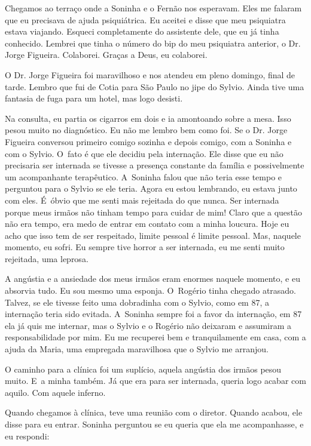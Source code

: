 Chegamos ao terraço onde a Soninha e o Fernão nos esperavam. Eles me
falaram que eu precisava de ajuda psiquiátrica. Eu aceitei e disse que
meu psiquiatra estava viajando. Esqueci completamente do assistente
dele, que eu já tinha conhecido. Lembrei que tinha o número do bip do
meu psiquiatra anterior, o Dr. Jorge Figueira. Colaborei. Graças a Deus,
eu colaborei.

O Dr. Jorge Figueira foi maravilhoso e nos atendeu em pleno domingo,
final de tarde. Lembro que fui de Cotia para São Paulo no jipe do
Sylvio. Ainda tive uma fantasia de fuga para um hotel, mas logo desisti.

Na consulta, eu partia os cigarros em dois e ia amontoando sobre a mesa.
Isso pesou muito no diagnóstico. Eu não me lembro bem como foi. Se o Dr.
Jorge Figueira conversou primeiro comigo sozinha e depois comigo, com a
Soninha e com o Sylvio. O~fato é que ele decidiu pela internação. Ele disse
que eu não precisaria ser internada se tivesse a presença constante da
família e possivelmente um acompanhante terapêutico. A~Soninha falou que
não teria esse tempo e perguntou para o Sylvio se ele teria. Agora eu
estou lembrando, eu estava junto com eles. É~óbvio que me senti mais
rejeitada do que nunca. Ser internada porque meus irmãos não tinham tempo
para cuidar de mim! Claro que a questão não era tempo, era medo de
entrar em contato com a minha loucura. Hoje eu acho que isso tem de ser
respeitado, limite pessoal é limite pessoal. Mas, naquele momento, eu
sofri. Eu sempre tive horror a ser internada, eu me senti muito
rejeitada, uma leprosa.

A angústia e a ansiedade dos meus irmãos eram enormes naquele momento, e
eu absorvia tudo. Eu sou mesmo uma esponja. O~Rogério tinha chegado
atrasado. Talvez, se ele tivesse feito uma dobradinha com o Sylvio, como
em 87, a internação teria sido evitada. A~Soninha sempre foi a favor da
internação, em 87 ela já quis me internar, mas o Sylvio e o Rogério não
deixaram e assumiram a responsabilidade por mim. Eu me recuperei bem e
tranquilamente em casa, com a ajuda da Maria, uma empregada maravilhosa
que o Sylvio me arranjou.

O caminho para a clínica foi um suplício, aquela angústia dos irmãos
pesou muito. E~a minha também. Já que era para ser internada, queria
logo acabar com aquilo. Com aquele inferno.

Quando chegamos à clínica, teve uma reunião com o diretor. Quando
acabou, ele disse para eu entrar. Soninha perguntou se eu queria que ela
me acompanhasse, e eu respondi:

